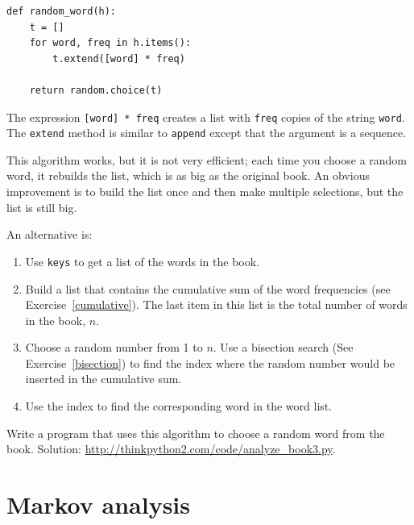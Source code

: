 \documentclass[10pt]{book}
\begin{document}
\begin{verbatim}
def random_word(h):
    t = []
    for word, freq in h.items():
        t.extend([word] * freq)

    return random.choice(t)
\end{verbatim}
%
The expression {\tt [word] * freq} creates a list with {\tt freq}
copies of the string {\tt word}.  The {\tt extend}
method is similar to {\tt append} except that the argument is
a sequence.

This algorithm works, but it is not very efficient; each time you
choose a random word, it rebuilds the list, which is as big as
the original book.  An obvious improvement is to build the list
once and then make multiple selections, but the list is still big.

An alternative is:

\begin{enumerate}

\item Use {\tt keys} to get a list of the words in the book.

\item Build a list that contains the cumulative sum of the word
  frequencies (see Exercise~\ref{cumulative}).  The last item
  in this list is the total number of words in the book, $n$.

\item Choose a random number from 1 to $n$.  Use a bisection search
  (See Exercise~\ref{bisection}) to find the index where the random
  number would be inserted in the cumulative sum.

\item Use the index to find the corresponding word in the word list.

\end{enumerate}

\begin{exercise}
\label{randhist}

Write a program that uses this algorithm to choose a random word from
the book.  Solution:
\url{http://thinkpython2.com/code/analyze_book3.py}.

\end{exercise}



\section{Markov analysis}
\label{markov}
\end{document}
